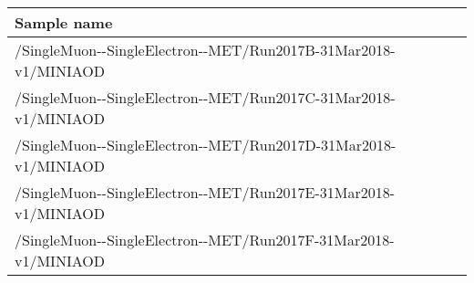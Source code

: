 \footnotesize
\begin{tabular}{lrr}
  \hline
  \textbf{Sample name} \\
  \hline
  \ttfamily/SingleMuon-{}-SingleElectron-{}-MET/Run2017B-31Mar2018-v1/MINIAOD \\
  \ttfamily/SingleMuon-{}-SingleElectron-{}-MET/Run2017C-31Mar2018-v1/MINIAOD \\
  \ttfamily/SingleMuon-{}-SingleElectron-{}-MET/Run2017D-31Mar2018-v1/MINIAOD \\
  \ttfamily/SingleMuon-{}-SingleElectron-{}-MET/Run2017E-31Mar2018-v1/MINIAOD \\
  \ttfamily/SingleMuon-{}-SingleElectron-{}-MET/Run2017F-31Mar2018-v1/MINIAOD \\
  \hline
\end{tabular}
